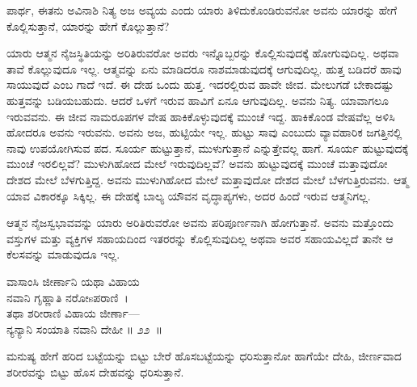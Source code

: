 \begin{artha}
ಪಾರ್ಥ, ಈತನು ಅವಿನಾಶಿ ನಿತ್ಯ ಅಜ ಅವ್ಯಯ ಎಂದು ಯಾರು ತಿಳಿದುಕೊಂಡಿರುವನೋ ಅವನು ಯಾರನ್ನು ಹೇಗೆ ಕೊಲ್ಲಿಸುತ್ತಾನೆ, ಯಾರನ್ನು ಹೇಗೆ ಕೊಲ್ಲುತ್ತಾನೆ?
\end{artha}

ಯಾರು ಆತ್ಮನ ನೈಜಸ್ಥಿತಿಯನ್ನು ಅರಿತಿರುವರೋ ಅವರು ಇನ್ನೊಬ್ಬರನ್ನು ಕೊಲ್ಲಿಸುವುದಕ್ಕೆ ಹೋಗುವುದಿಲ್ಲ. ಅಥವಾ ತಾವೆ ಕೊಲ್ಲುವುದೂ ಇಲ್ಲ. ಆತ್ಮವನ್ನು ಏನು ಮಾಡಿದರೂ ನಾಶಮಾಡುವುದಕ್ಕೆ ಆಗುವುದಿಲ್ಲ. ಹುತ್ತ ಬಡಿದರೆ ಹಾವು ಸಾಯುವುದೆ ಎಂಬ ಗಾದೆ ಇದೆ. ಈ ದೇಹ ಒಂದು ಹುತ್ತ. ಇದರಲ್ಲಿರುವ ಹಾವೇ ಜೀವ. ಮೇಲುಗಡೆ ಬೇಕಾದಷ್ಟು ಹುತ್ತವನ್ನು ಬಡಿಯಬಹುದು. ಆದರೆ ಒಳಗೆ ಇರುವ ಹಾವಿಗೆ ಏನೂ ಆಗುವುದಿಲ್ಲ. ಅವನು ನಿತ್ಯ. ಯಾವಾಗಲೂ ಇರುವವನು. ಈ ಜೀವ ನಾಮರೂಪಗಳ ವೇಷ ಹಾಕಿಕೊಳ್ಳುವುದಕ್ಕೆ ಮುಂಚೆ ಇದ್ದ. ಹಾಕಿಕೊಂಡ ವೇಷವೆಲ್ಲ ಅಳಿಸಿ ಹೋದರೂ ಅವನು ಇರುವನು. ಅವನು ಅಜ, ಹುಟ್ಟಿಯೇ ಇಲ್ಲ. ಹುಟ್ಟು ಸಾವು ಎಂಬುದು ವ್ಯಾವಹಾರಿಕ ಜಗತ್ತಿನಲ್ಲಿ ನಾವು ಉಪಯೋಗಿಸುವ ಪದ. ಸೂರ್ಯ ಹುಟ್ಟುತ್ತಾನೆ, ಮುಳುಗುತ್ತಾನೆ ಎನ್ನುತ್ತೇವಲ್ಲ ಹಾಗೆ. ಸೂರ್ಯ ಹುಟ್ಟುವುದಕ್ಕೆ ಮುಂಚೆ ಇರಲಿಲ್ಲವೆ? ಮುಳುಗಿಹೋದ ಮೇಲೆ ಇರುವುದಿಲ್ಲವೆ? ಅವನು ಹುಟ್ಟುವುದಕ್ಕೆ ಮುಂಚೆ ಮತ್ತಾವುದೋ ದೇಶದ ಮೇಲೆ ಬೆಳಗುತ್ತಿದ್ದ. ಅವನು ಮುಳುಗಿಹೋದ ಮೇಲೆ ಮತ್ತಾವುದೋ ದೇಶದ ಮೇಲೆ ಬೆಳಗುತ್ತಿರುವನು. ಆತ್ಮ ಯಾವ ವಿಕಾರಕ್ಕೂ ಸಿಕ್ಕಿಲ್ಲ. ಈ ದೇಹಕ್ಕೆ ಬಾಲ್ಯ ಯೌವನ ವೃದ್ಧಾಪ್ಯಗಳು, ಅದರ ಹಿಂದೆ ಇರುವ ಆತ್ಮನಿಗಲ್ಲ.

ಆತ್ಮನ ನೈಜಸ್ವಭಾವವನ್ನು ಯಾರು ಅರಿತಿರುವರೋ ಅವನು ಪರಿಪೂರ್ಣನಾಗಿ ಹೋಗುತ್ತಾನೆ. ಅವನು ಮತ್ತೊಂದು ವಸ್ತುಗಳ ಮತ್ತು ವ್ಯಕ್ತಿಗಳ ಸಹಾಯದಿಂದ ಇತರರನ್ನು ಕೊಲ್ಲಿಸುವುದಿಲ್ಲ ಅಥವಾ ಅವರ ಸಹಾಯವಿಲ್ಲದೆ ತಾನೇ ಆ ಕೆಲಸವನ್ನು ಮಾಡುವುದೂ ಇಲ್ಲ.

\begin{shloka}
ವಾಸಾಂಸಿ ಜೀರ್ಣಾನಿ ಯಥಾ ವಿಹಾಯ\\ನವಾನಿ ಗೃಹ್ಣಾತಿ ನರೋsಪರಾಣಿ~।\\ತಥಾ ಶರೀರಾಣಿ ವಿಹಾಯ ಜೀರ್ಣಾ—\\ನ್ಯನ್ಯಾನಿ ಸಂಯಾತಿ ನವಾನಿ ದೇಹೀ \hfill॥ ೨೨~॥
\end{shloka}

\begin{artha}
ಮನುಷ್ಯ ಹೇಗೆ ಹರಿದ ಬಟ್ಟೆಯನ್ನು ಬಿಟ್ಟು ಬೇರೆ ಹೊಸಬಟ್ಟೆಯನ್ನು ಧರಿಸುತ್ತಾನೋ ಹಾಗೆಯೇ ದೇಹಿ, ಜೀರ್ಣವಾದ ಶರೀರವನ್ನು ಬಿಟ್ಟು ಹೊಸ ದೇಹವನ್ನು ಧರಿಸುತ್ತಾನೆ.
\end{artha}

